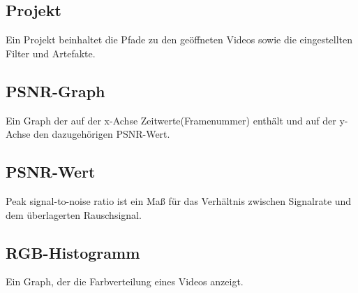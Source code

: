 \documentclass[parskip=full]{scrartcl}
\begin{document}
\subsection*{Projekt} 
Ein Projekt beinhaltet die Pfade zu den geöffneten Videos sowie die eingestellten Filter und Artefakte.
\subsection*{PSNR-Graph} 
Ein Graph der auf der x-Achse Zeitwerte(Framenummer) enthält und auf der y-Achse den dazugehörigen PSNR-Wert.
\subsection*{PSNR-Wert} 
Peak signal-to-noise ratio ist ein Maß für das Verhältnis zwischen Signalrate und dem überlagerten Rauschsignal.
\subsection*{RGB-Histogramm} 
Ein Graph, der die Farbverteilung eines Videos anzeigt.
\end{document}
